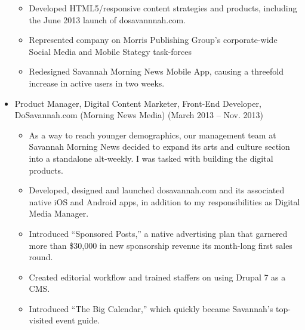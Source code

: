 \documentclass{article}
\begin{document}
\begin{itemize}[noitemsep,topsep=\mdcompacttopsep]
\begin{itemize}[noitemsep,topsep=\mdcompacttopsep]
\item{}Developed HTML5/responsive content strategies and products, including the June 2013 launch of dosavannnah.com.%

\item{}Represented company on Morris Publishing Group's corporate-wide Social Media and Mobile Stategy task-forces%

\item{}Redesigned Savannah Morning News Mobile App, causing a threefold increase in active users in two weeks.%
\end{itemize}%

\item{}Product Manager, Digital Content Marketer, Front-End Developer, DoSavannah.com (Morning News Media) (March 2013 – Nov. 2013)

\begin{itemize}[noitemsep,topsep=\mdcompacttopsep]%

\item{}As a way to reach younger demographics, our management team at Savannah Morning News decided to expand its arts and culture section into a standalone alt-weekly. I was tasked with building the digital products.%

\item{}Developed, designed and launched dosavannah.com and its associated native iOS and Android apps, in addition to my responsibilities as Digital Media Manager.%

\item{}Introduced \textquotedblleft{}Sponsored Posts,\textquotedblright{} a native advertising plan that garnered more than \$30,000 in new sponsorship revenue its month-long first sales round.%

\item{}Created editorial workflow and trained staffers on using Drupal 7 as a CMS.%

\item{}Introduced \textquotedblleft{}The Big Calendar,\textquotedblright{} which quickly became Savannah's top-visited event guide.%
\end{itemize}%


\end{itemize}
\end{document}
